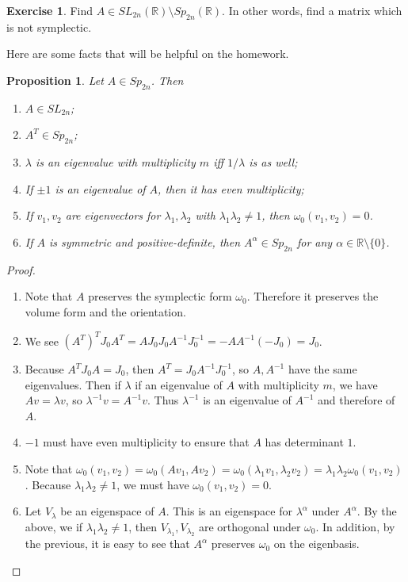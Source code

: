\documentclass[leqno, openany]{memoir}
\newtheorem{prop}[thm]{Proposition}
\theoremstyle{definition}
\newtheorem{exer}[thm]{Exercise}
\theoremstyle{remark}
\theoremstyle{plain}
\theoremstyle{definition}
\theoremstyle{remark}
\newcommand{\R}{\mathbb{R}}
\begin{document}
\begin{exer} Find $A \in SL_{2n}(\R) \setminus Sp_{2n}(\R)$. In other words,
find a matrix which is not symplectic.  \end{exer}

Here are some facts that will be helpful on the homework.

\begin{prop} Let $A \in Sp_{2n}$. Then \begin{enumerate} \item $A \in SL_{2n}$;
    \item $A^T \in Sp_{2n}$; \item $\lambda$ is an eigenvalue with multiplicity
        $m$ iff $1/\lambda$ is as well; \item If $\pm 1$ is an eigenvalue of
        $A$, then it has even multiplicity; \item If $v_1, v_2$ are
        eigenvectors for $\lambda_1, \lambda_2$ with $\lambda_1\lambda_2 \neq
        1$, then $\omega_0(v_1, v_2) = 0$.  \item If $A$ is symmetric and
        positive-definite, then $A^{\alpha} \in Sp_{2n}$ for any $\alpha \in \R
        \setminus \{0\}$.  \end{enumerate} \end{prop}

\begin{proof} \begin{enumerate} \item Note that $A$ preserves the symplectic
    form $\omega_0$. Therefore it preserves the volume form and the
    orientation.  \item We see $(A^T)^T J_0 A^T = A J_0 J_0 A^{-1}J_0^{-1} =
    -AA^{-1}(-J_0) = J_0$.  \item Because $A^T J_0 A = J_0$, then $A^T = J_0
    A^{-1} J_0^{-1}$, so $A, A^{-1}$ have the same eigenvalues. Then if
    $\lambda$ if an eigenvalue of $A$ with multiplicity $m$, we have $Av =
    \lambda v$, so $\lambda^{-1}v = A^{-1}v$. Thus $\lambda^{-1}$ is an
    eigenvalue of $A^{-1}$ and therefore of $A$.  \item $-1$ must have even
    multiplicity to ensure that $A$ has determinant $1$.  \item Note that
    $\omega_0(v_1, v_2) = \omega_0(Av_1, Av_2) = \omega_0(\lambda_1 v_1,
    \lambda_2 v_2) = \lambda_1 \lambda_2 \omega_0(v_1, v_2)$. Because
    $\lambda_1 \lambda_2 \neq 1$, we must have $\omega_0(v_1, v_2) = 0$.  \item
    Let $V_{\lambda}$ be an eigenspace of $A$. This is an eigenspace for
    $\lambda^{\alpha}$ under $A^{\alpha}$. By the above, we if $\lambda_1
    \lambda_2 \neq 1$, then $V_{\lambda_1}, V_{\lambda_2}$ are orthogonal under
    $\omega_0$. In addition, by the previous, it is easy to see that
    $A^{\alpha}$ preserves $\omega_0$ on the eigenbasis. \qedhere
    \end{enumerate} \end{proof}
\end{document}
